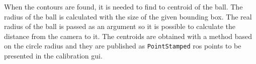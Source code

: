 When the contours are found, it is needed to find to centroid of the ball. The radius of the ball is calculated with the size of the given bounding box. The real radius of the ball is passed as an argument so it is possible to calculate the distance from the camera to it. The centroids are obtained with a method based on the circle radius and they are published as \texttt{PointStamped} \gls{ros} points to be presented in the calibration \gls{gui}. 















 

